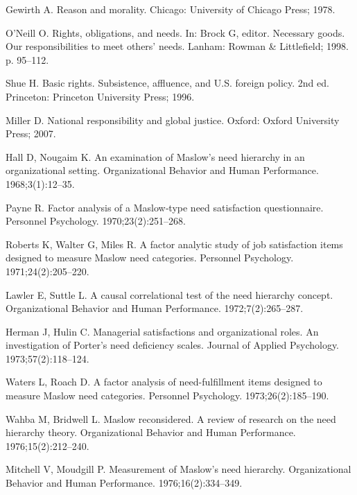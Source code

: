 \documentclass[10pt,letterpaper]{article}
\begin{document}
\begin{thebibliography}{100}
Gewirth A.
\newblock Reason and morality.
\newblock Chicago: University of Chicago Press; 1978.

O'Neill O.
\newblock Rights, obligations, and needs.
\newblock In: Brock G, editor. Necessary goods. {Our} responsibilities to meet
  others' needs. Lanham: Rowman \& Littlefield; 1998. p. 95--112.

Shue H.
\newblock Basic rights. {Subsistence}, affluence, and {U}.{S}. foreign policy.
\newblock 2nd ed. Princeton: Princeton University Press; 1996.

Miller D.
\newblock National responsibility and global justice.
\newblock Oxford: Oxford University Press; 2007.

Hall D, Nougaim K.
\newblock An examination of {Maslow}'s need hierarchy in an organizational
  setting.
\newblock Organizational Behavior and Human Performance. 1968;3(1):12--35.

Payne R.
\newblock Factor analysis of a {Maslow}‐type need satisfaction questionnaire.
\newblock Personnel Psychology. 1970;23(2):251--268.

Roberts K, Walter G, Miles R.
\newblock A factor analytic study of job satisfaction items designed to measure
  {Maslow} need categories.
\newblock Personnel Psychology. 1971;24(2):205--220.

Lawler E, Suttle L.
\newblock A causal correlational test of the need hierarchy concept.
\newblock Organizational Behavior and Human Performance. 1972;7(2):265--287.

Herman J, Hulin C.
\newblock Managerial satisfactions and organizational roles. {An} investigation
  of {Porter}'s need deficiency scales.
\newblock Journal of Applied Psychology. 1973;57(2):118--124.

Waters L, Roach D.
\newblock A factor analysis of need-fulfillment items designed to measure
  {Maslow} need categories.
\newblock Personnel Psychology. 1973;26(2):185--190.

Wahba M, Bridwell L.
\newblock Maslow reconsidered. {A} review of research on the need hierarchy
  theory.
\newblock Organizational Behavior and Human Performance. 1976;15(2):212--240.

Mitchell V, Moudgill P.
\newblock Measurement of {Maslow}'s need hierarchy.
\newblock Organizational Behavior and Human Performance. 1976;16(2):334--349.


\end{thebibliography}
\end{document}
